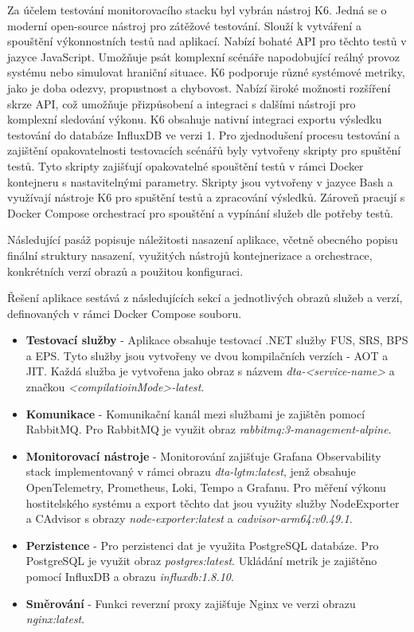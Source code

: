 
Za účelem testování monitorovacího stacku byl vybrán nástroj K6. Jedná se o moderní open-source nástroj pro zátěžové testování. Slouží k vytváření a spouštění výkonnostních testů nad aplikací. Nabízí bohaté API pro těchto testů v jazyce JavaScript. Umožňuje psát komplexní scénáře napodobující reálný provoz systému nebo simulovat hraniční situace. K6 podporuje různé systémové metriky, jako je doba odezvy, propustnost a chybovost. Nabízí široké možnosti rozšíření skrze API, což umožňuje přizpůsobení a integraci s dalšími nástroji pro komplexní sledování výkonu. K6 obsahuje nativní integraci exportu výsledku testování do databáze InfluxDB ve verzi 1. Pro zjednodušení procesu testování a zajištění opakovatelnosti testovacích scénářů byly vytvořeny skripty pro spuštění testů. Tyto skripty zajišťují opakovatelné spouštění testů v rámci Docker kontejneru s nastavitelnými parametry. Skripty jsou vytvořeny v jazyce Bash a využívají nástroje K6 pro spuštění testů a zpracování výsledků. Zároveň pracují s Docker Compose orchestrací pro spouštění a vypínání služeb dle potřeby testů.


Následující pasáž popisuje náležitosti nasazení aplikace, včetně obecného popisu finální struktury nasazení, využitých nástrojů kontejnerizace a orchestrace, konkrétních verzí obrazů a použitou konfiguraci.


Řešení aplikace sestává z následujících sekcí a jednotlivých obrazů služeb a verzí, definovaných v rámci Docker Compose souboru.

\begin{itemize}
    \item \textbf{Testovací služby} - Aplikace obsahuje testovací .NET služby FUS, SRS, BPS a EPS. Tyto služby jsou vytvořeny ve dvou kompilačních verzích - AOT a JIT. Každá služba je vytvořena jako obraz s názvem \emph{dta-<service-name>} a značkou \emph{<compilatioinMode>-latest}.
    \item \textbf{Komunikace} - Komunikační kanál mezi službami je zajištěn pomocí RabbitMQ. Pro RabbitMQ je využit obraz \emph{rabbitmq:3-management-alpine}.
    \item \textbf{Monitorovací nástroje} - Monitorování zajišťuje Grafana Observability stack implementovaný v rámci obrazu \emph{dta-lgtm:latest}, jenž obsahuje OpenTelemetry, Prometheus, Loki, Tempo a Grafanu. Pro měření výkonu hostitelského systému a export těchto dat jsou využity služby NodeExporter a CAdvisor s obrazy \emph{node-exporter:latest} a \emph{cadvisor-arm64:v0.49.1}.
    \item \textbf{Perzistence} - Pro perzistenci dat je využita PostgreSQL databáze. Pro PostgreSQL je využit obraz \emph{postgres:latest}. Ukládání metrik je zajištěno pomocí InfluxDB a obrazu \emph{influxdb:1.8.10}.
    \item \textbf{Směrování} - Funkci reverzní proxy zajišťuje Nginx ve verzi obrazu \emph{nginx:latest}.
\end{itemize}


